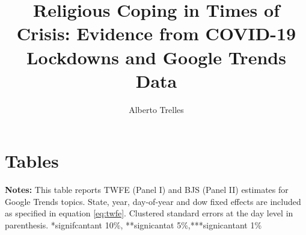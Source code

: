 \documentclass{article}
\title{Religious Coping in Times of Crisis: Evidence from COVID-19 Lockdowns and Google Trends Data}
\author{Alberto Trelles}
\date{\monthname[\month] \the\year}
\begin{document}


\section{Tables}

\begin{table}[htb!]
\caption{DiD estimates on Topics}
\begin{center}
\end{center}
\label{tab:twfe_bjs1}
\justifying
{\scriptsize \textbf{Notes:} This table reports TWFE (Panel I) and BJS (Panel II) estimates for Google Trends topics. State, year, day-of-year and dow fixed effects are included as specified in equation \ref{eq:twfe}. Clustered standard errors at the day level in parenthesis.  *signifcantant 10\%, **signicantat 5\%,***signicantant 1\%  \par}
\end{table}
\end{document}
